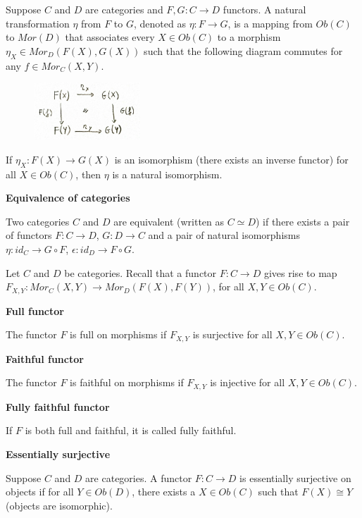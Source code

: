 \begin{definition}
Suppose $C$ and $D$ are categories and $F, G: C \to D$ functors. A natural transformation $\eta$ from $F$ to $G$, denoted as $\eta : F \to G$, is a mapping from $Ob(C)$ to $Mor(D)$ that associates every $X \in Ob(C)$ to a morphism $\eta_X \in Mor_D(F(X), G(X))$ such that the following diagram commutes for any $f \in Mor_C(X, Y )$.

\begin{figure}[H]
\centering
\includegraphics[width=4cm]{images/natural.jpg}
\end{figure}

If $\eta_X:F(X) \to G(X)$ is an isomorphism (there exists an inverse functor) for all $X \in Ob(C)$, then $\eta$ is a natural isomorphism.



\textbf{Equivalence of categories}

Two categories $C$ and $D$ are equivalent (written as $C \simeq D$) if there exists a pair of functors $F : C \to D$, $G: D \to C$ and a pair of natural isomorphisms $\eta: id_C \to G \circ F$, $\epsilon: id_D \to F \circ G$.

Let $C$ and $D$ be categories. Recall that a functor $F : C \to D$ gives rise to map $F_{X,Y} : Mor_C(X,Y) \to Mor_D(F (X), F (Y ))$, for all $X, Y \in Ob(C)$. 

\textbf{Full functor}

The functor $F$ is full on morphisms if $F_{X,Y}$ is surjective for all $X, Y \in Ob(C)$.

\textbf{Faithful functor}

The functor $F$ is faithful on morphisms if $F_{X,Y}$ is injective for all $X, Y \in Ob(C)$. 

\textbf{Fully faithful functor}

If $F$ is both full and faithful, it is called fully faithful.

\textbf{Essentially surjective}

Suppose $C$ and $D$ are categories. A functor $F : C \to D$ is essentially surjective on objects if for all $Y \in Ob(D)$, there exists a $X \in Ob(C)$ such that $F(X) \cong Y $ (objects are isomorphic).

\end{definition}


